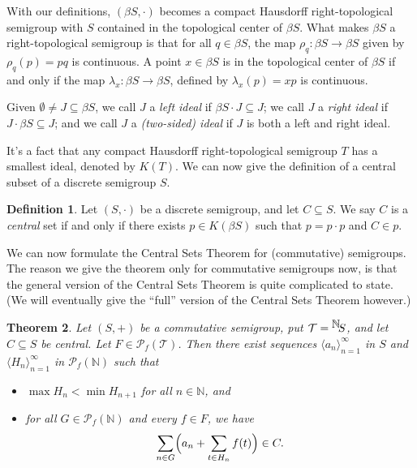 \documentclass[12pt]{article}
\theoremstyle{plain}
\newtheorem{thm}{Theorem}[section]
\theoremstyle{definition}
\newtheorem{defn}[thm]{Definition}
\newcommand{\la}{\langle}
\newcommand{\ra}{\rangle}
\newcommand{\bbN}{\mathbb{N}}
\newcommand{\setfunc}[2]{\hbox{${}^{\hbox{$#1$}}\hskip -2 pt #2$}}
\begin{document}
With our definitions, $(\beta S, \cdot)$ becomes a compact Hausdorff
right-topological semigroup with $S$ contained in the topological
center of $\beta S$.
What makes $\beta S$ a right-topological semigroup is that for all $q
\in \beta S$, the map $\rho_q : \beta S \to \beta S$ given by
$\rho_q(p) = pq$ is continuous. 
A point $x \in \beta S$ is in the topological center of $\beta S$ if
and only if the map $\lambda_x : \beta S \to \beta S$, defined by
$\lambda_x(p) = xp$ is continuous.

Given $\emptyset \ne J \subseteq \beta S$, we call $J$ a \textsl{left
  ideal} if $\beta S \cdot J \subseteq J$; we call $J$ a \textsl{right
  ideal} if $J \cdot \beta S \subseteq J$; and we call $J$ a
\textsl{(two-sided) ideal} if $J$ is both a left and right ideal.

It's a fact \cite[Theorem 2.8]{Hindman:1998fk} that any compact Hausdorff right-topological semigroup $T$ has
a smallest ideal, denoted by $K(T)$. 
We can now give the definition of a central subset of a discrete
semigroup $S$.

\begin{defn}
  Let $(S, \cdot)$ be a discrete semigroup, and let $C \subseteq S$.
  We say $C$ is a \textsl{central} set if and only if there exists
  $p \in K(\beta S)$ such that $p = p \cdot p$ and $C \in p$.
\end{defn}

We can now formulate the Central Sets Theorem for (commutative)
semigroups.
The reason we give the theorem only for commutative semigroups now,
is that the general version of the Central Sets Theorem is quite
complicated to state. 
(We will eventually give the ``full'' version of the Central Sets
Theorem however.)
\begin{thm}
    \label{thm:cst2}
    Let $(S,+)$ be a commutative semigroup, put $\mathcal{T} =
    \setfunc{\bbN}{S}$, and let $C \subseteq S$ be central.
    Let $F \in \mathcal{P}_f(\mathcal{T})$. 
    Then there exist sequences $\la a_n \ra_{n=1}^\infty$ in $S$ and
    $\la H_n \ra_{n=1}^\infty$ in $\mathcal{P}_f(\bbN)$ such that
      \begin{itemize}
        \item[(1)] $\max H_n < \min H_{n+1}$ for all $n \in \bbN$, and
        \item[(2)] for all $G \in \mathcal{P}_f(\bbN)$ and every $f
          \in F$, we have
          \[
            \sum_{n \in G}\Bigl(a_n + \sum_{t \in H_n} f(t)\Bigr) \in C.
          \]
      \end{itemize}
  \end{thm}
\end{document}
